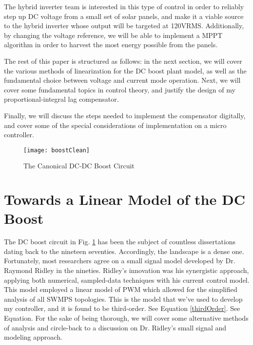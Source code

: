 The hybrid inverter team is interested in this type of control in order to reliably step up DC voltage from a small set of solar panels, and make it a viable source to the hybrid inverter whose output will be targeted at 120VRMS.
Additionally, by changing the voltage reference, we will be able to implement a MPPT algorithm in order to harvest the most energy possible from the panels.

The rest of this paper is structured as follows: in the next section, we will cover the various methods of linearization for the DC boost plant model, as well as the fundamental choice between voltage and current mode operation. Next, we will cover some fundamental topics in control theory, and justify the design of my proportional-integral lag compensator. 

Finally, we will discuss the steps needed to implement the compensator digitally, and cover some of the special considerations of implementation on a micro controller.  

\begin{figure}[htbp]
\begin{center}
\texttt{[image: boostClean]}
\caption{The Canonical DC-DC Boost Circuit}
\label{boost}
\end{center}
\end{figure}


\section{Towards a Linear Model of the DC Boost}

The DC boost circuit in Fig. \ref{boost} has been the subject of countless dissertations dating back to the nineteen seventies. Accordingly, the landscape is a dense one. Fortunately, most researchers agree on a small signal model developed by Dr. Raymond Ridley in the nineties. Ridley's innovation was his synergistic approach, applying both numerical, sampled-data techniques with his current control model. This model employed a linear model of PWM which allowed for the simplified analysis of all SWMPS topologies. This is the model that we've used to develop my controller, and it is found to be third-order. See Equation \ref{thirdOrder}. See Equation. For the sake of being thorough, we will cover some alternative methods of analysis and circle-back to a discussion on Dr. Ridley's small signal and modeling approach.

